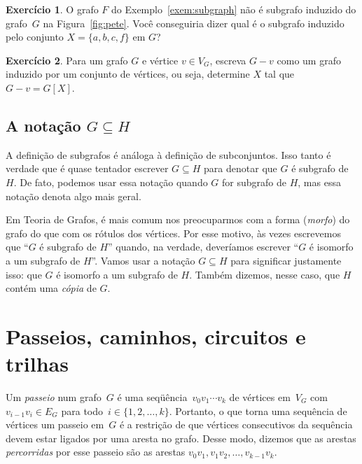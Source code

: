 \documentclass[12pt, a4paper]{article}
\theoremstyle{definition}
\newtheorem{exer}{Exercício}
\begin{document}
\begin{exer}
O grafo $F$ do Exemplo~\ref{exem:subgraph} não é subgrafo induzido do grafo~$G$ na Figura~\ref{fig:pete}. Você conseguiria dizer qual é o subgrafo induzido pelo conjunto  $X = \{a,b,c,f\}$ em $G$? 
\end{exer}

\begin{exer}
Para um grafo $G$ e vértice $v \in V_G$, escreva $G - v$ como um grafo induzido por um conjunto de vértices, ou seja, determine $X$ tal que $G - v = G[X]$.
\end{exer}


\subsection{A notação \texorpdfstring{$G \subseteq H$}{G subconjunto de H}}

A definição de subgrafos é análoga à definição de subconjuntos. Isso tanto é verdade que é quase tentador escrever $G \subseteq H$ para denotar que $G$ é subgrafo de $H$. De fato, podemos usar essa notação quando $G$ for subgrafo de $H$, mas essa notação denota algo mais geral.

Em Teoria de Grafos, é mais comum nos preocuparmos com a forma (\emph{morfo}) do grafo do que com os rótulos dos vértices. Por esse motivo, às vezes escrevemos que ``$G$ é subgrafo de $H$'' quando, na verdade, deveríamos escrever ``$G$ é isomorfo a um subgrafo de $H$''. Vamos usar a notação $G \subseteq H$ para significar justamente isso: que $G$ é isomorfo a um subgrafo de $H$. Também dizemos, nesse caso, que $H$ contém uma \emph{cópia} de $G$.

\section{Passeios, caminhos, circuitos e trilhas}

Um \emph{passeio} num grafo~$G$ é uma seqüência~$v_0 v_1
\cdots v_k$ de vértices em~$V_G$ com~$v_{i-1} v_i \in E_G$ para todo~$i \in \{1,2,\dots,k\}$. Portanto, o que torna uma sequência de vértices um passeio em~$G$ é a restrição de que vértices consecutivos da sequência devem estar ligados por uma aresta no grafo. Desse modo, dizemos que as arestas \emph{percorridas} por esse passeio são as arestas $v_0v_1, v_1v_2, \dots, v_{k-1}v_k$.  
\end{document}
